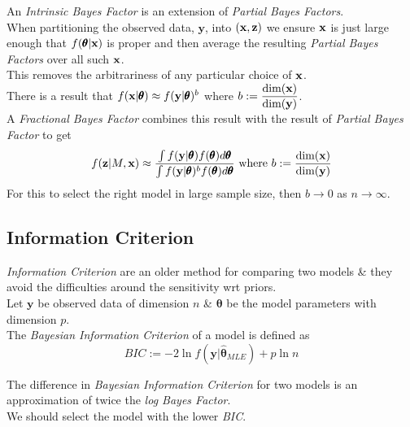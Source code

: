\documentclass[11pt,a4paper]{article}
\begin{document}
An \textit{Intrinsic Bayes Factor} is an extension of \textit{Partial Bayes Factors}.\\
When partitioning the observed data, $\textbf{y}$, into $(\textbf{x},\textbf{z})$ we ensure $\textbf{x}$ is just large enough that $f(\pmb\theta|\textbf{x})$ is proper and then average the resulting \textit{Partial Bayes Factors} over all such $\textbf{x}$.\\
This removes the arbitrariness of any particular choice of $\textbf{x}$.\\

There is a result that $f(\textbf{x}|\pmb\theta)\approx f(\textbf{y}|\pmb\theta)^b$ where $b:=\dfrac{\text{dim}(\textbf{x})}{\text{dim}(\textbf{y})}$.\\
A \textit{Fractional Bayes Factor} combines this result with the result of \textit{Partial Bayes Factor} to get
$$f(\textbf{z}|M,\textbf{x})\approx\dfrac{\int f(\textbf{y}|\pmb\theta)f(\pmb\theta)d\pmb\theta}{\int f(\textbf{y}|\pmb\theta)^bf(\pmb\theta)d\pmb\theta}\text{ where }b:=\dfrac{\text{dim}(\textbf{x})}{\text{dim}(\textbf{y})}$$
For this to select the right model in large sample size, then $b\to0$ as $n\to\infty$.

\subsection{Information Criterion}

\textit{Information Criterion} are an older method for comparing two models \& they avoid the difficulties around the sensitivity wrt priors.\\

Let $\textbf{y}$ be observed data of dimension $n$ \& $\pmb\theta$ be the model parameters with dimension $p$.\\
The \textit{Bayesian Information Criterion} of a model is defined as
$$BIC:=-2\ln f(\textbf{y}|\hat{\pmb\theta}_{MLE})+p\ln n$$

The difference in \textit{Bayesian Information Criterion} for two models is an approximation of twice the \textit{log Bayes Factor}.\\
We should select the model with the lower \textit{BIC}.\\
\end{document}
